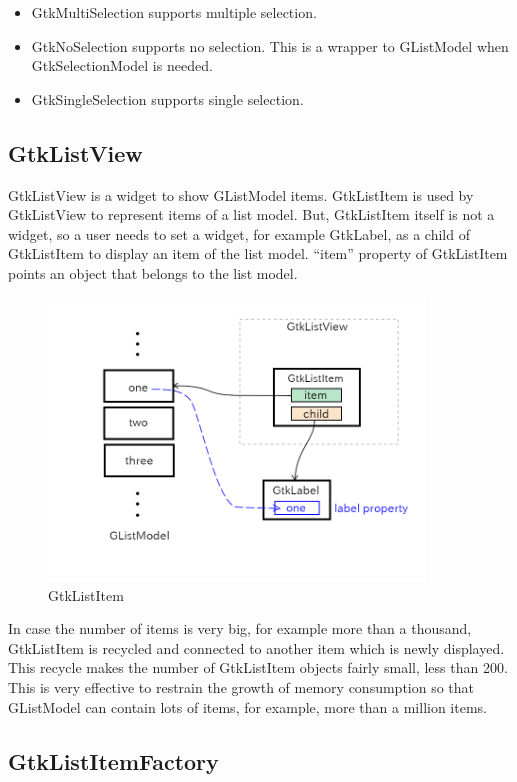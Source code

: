 \begin{itemize}
\tightlist
\item
  GtkMultiSelection supports multiple selection.
\item
  GtkNoSelection supports no selection. This is a wrapper to GListModel
  when GtkSelectionModel is needed.
\item
  GtkSingleSelection supports single selection.
\end{itemize}

\subsection{GtkListView}\label{gtklistview-1}

GtkListView is a widget to show GListModel items. GtkListItem is used by
GtkListView to represent items of a list model. But, GtkListItem itself
is not a widget, so a user needs to set a widget, for example GtkLabel,
as a child of GtkListItem to display an item of the list model. ``item''
property of GtkListItem points an object that belongs to the list model.

\begin{figure}
\centering
\includegraphics[width=10cm,height=7.5cm]{../image/gtklistitem.png}
\caption{GtkListItem}
\end{figure}

In case the number of items is very big, for example more than a
thousand, GtkListItem is recycled and connected to another item which is
newly displayed. This recycle makes the number of GtkListItem objects
fairly small, less than 200. This is very effective to restrain the
growth of memory consumption so that GListModel can contain lots of
items, for example, more than a million items.

\subsection{GtkListItemFactory}\label{gtklistitemfactory}

